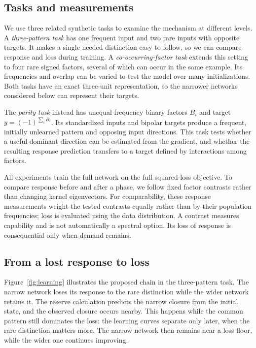 \documentclass[11pt,a4paper]{article}
\begin{document}
\subsection{Tasks and measurements}

We use three related synthetic tasks to examine the mechanism at different levels. A \emph{three-pattern task} has one frequent input and two rare inputs with opposite targets. It makes a single needed distinction easy to follow, so we can compare response and loss during training. A \emph{co-occurring-factor task} extends this setting to four rare signed factors, several of which can occur in the same example. Its frequencies and overlap can be varied to test the model over many initializations. Both tasks have an exact three-unit representation, so the narrower networks considered below can represent their targets.

The \emph{parity task} instead has unequal-frequency binary factors $B_i$ and target $y=(-1)^{\sum_i B_i}$. Its standardized inputs and bipolar targets produce a frequent, initially unlearned pattern and opposing input directions. This task tests whether a useful dominant direction can be estimated from the gradient, and whether the resulting response prediction transfers to a target defined by interactions among factors.

All experiments train the full network on the full squared-loss objective. To compare response before and after a phase, we follow fixed factor contrasts rather than changing kernel eigenvectors. For comparability, these response measurements weight the tested contrasts equally rather than by their population frequencies; loss is evaluated using the data distribution. A contrast measures capability and is not automatically a spectral option. Its loss of response is consequential only when demand remains.

\subsection{From a lost response to loss}

Figure~\ref{fig:learning} illustrates the proposed chain in the three-pattern task. The narrow network loses its response to the rare distinction while the wider network retains it. The reserve calculation predicts the narrow closure from the initial state, and the observed closure occurs nearby. This happens while the common pattern still dominates the loss: the learning curves separate only later, when the rare distinction matters more. The narrow network then remains near a loss floor, while the wider one continues improving.
\end{document}

